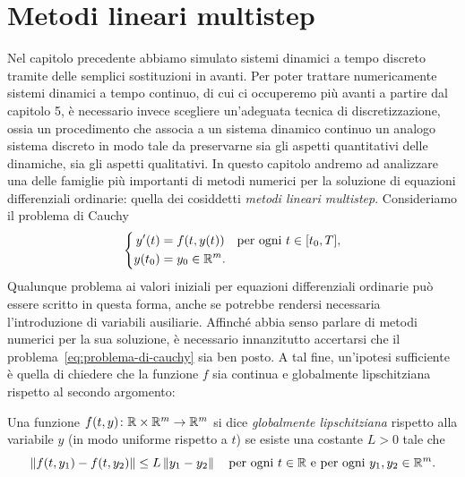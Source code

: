 \graphicspath{{./figures/capitolo3/}}
\lstset{inputpath = ./programs/capitolo3}

\chapter{Metodi lineari multistep}
Nel capitolo precedente abbiamo simulato sistemi dinamici
a tempo discreto tramite delle semplici sostituzioni in avanti.
Per poter trattare numericamente sistemi dinamici a tempo continuo,
di cui ci occuperemo più avanti a partire dal capitolo 5,
è necessario invece scegliere un'adeguata tecnica di discretizzazione,
ossia un procedimento che associa a un sistema dinamico continuo un analogo
sistema discreto in modo tale da preservarne sia gli aspetti quantitativi
delle dinamiche, sia gli aspetti qualitativi.
In questo capitolo andremo ad analizzare una delle famiglie più
importanti di metodi numerici per la soluzione di equazioni differenziali
ordinarie: quella dei cosiddetti \emph{metodi lineari multistep}.
Consideriamo il problema di Cauchy
\begin{equation}\label{eq:problema-di-cauchy}
\left\{
\begin{aligned}
y'(t)  &= f(t,y(t)) \quad \text{per ogni $t \in [t_0,T]$}, \\
y(t_0) &= y_0 \in \mathbb{R}^m.
\end{aligned}
\right.
\end{equation}
Qualunque problema ai valori iniziali per equazioni differenziali
ordinarie può essere scritto in questa forma, anche se potrebbe
rendersi necessaria l'introduzione di variabili ausiliarie.
Affinché abbia senso parlare di metodi numerici per la sua soluzione,
è necessario innanzitutto accertarsi che il
problema~\eqref{eq:problema-di-cauchy} sia ben posto.
A tal fine, un'ipotesi sufficiente è quella di chiedere che la funzione
$f$ sia continua e globalmente lipschitziana rispetto al secondo argomento:

\begin{defi}
Una funzione $f(t,y) \colon \mathbb{R} \times \mathbb{R}^m \to \mathbb{R}^m$ si dice
\emph{globalmente lipschitziana} rispetto alla variabile $y$
(in modo uniforme rispetto a $t$) se esiste una costante $L > 0$ tale che
\[
\left\lVert f(t,y_1)-f(t,y_2)\right\rVert \leq L \left\lVert y_1-y_2\right\rVert
\quad \text{per ogni $t \in \mathbb{R}$ e per ogni $y_1,y_2 \in \mathbb{R}^m$.}
\]
\end{defi}

